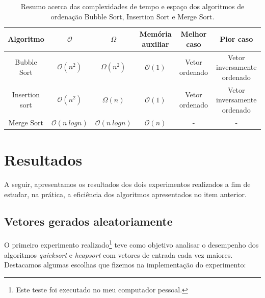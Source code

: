 \documentclass[fontsize=10pt]{article}
\begin{document}
\begin{table}[ht]
\centering
\begin{tabular}{@{}c|c|c|c|c|c@{}}
Algoritmo      & $\mathcal{O}$          & $\Omega$               & Memória auxiliar & Melhor caso    & Pior caso                   \\ \midrule
Bubble Sort    & $\mathcal{O}(n^2)$     & $\Omega(n^2)$          & $\mathcal{O}(1)$ & Vetor ordenado & Vetor inversamente ordenado \\
Insertion sort & $\mathcal{O}(n^2)$     & $\Omega(n)$            & $\mathcal{O}(1)$ & Vetor ordenado & Vetor inversamente ordenado \\
Merge Sort     & $\mathcal{O}(n\ logn)$ & $\mathcal{O}(n\ logn)$ & $\mathcal{O}(n)$ & -              & -                          
\end{tabular}
\caption{Resumo acerca das complexidades de tempo e espaço dos algoritmos de ordenação Bubble Sort, Insertion Sort e Merge Sort.}
\label{Tabela 1}
\end{table}

\section{Resultados}

\quad A seguir, apresentamos os resultados dos dois experimentos realizados a fim de estudar, na prática, a eficiência dos algoritmos apresentados no item anterior.

\subsection{Vetores gerados aleatoriamente}

\quad O primeiro experimento realizado\footnote{Este teste foi executado no meu computador pessoal.} teve como objetivo analisar o desempenho dos algoritmos \textit{quicksort} e \textit{heapsort} com vetores de entrada cada vez maiores. Destacamos algumas escolhas que fizemos na implementação do experimento:
\end{document}

